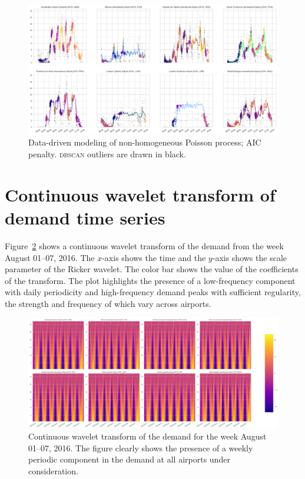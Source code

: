 \documentclass[]{elsarticle}
\newcommand{\DBSCAN}{\textsc{dbscan}}
\begin{document}
  \begin{figure}
      \includegraphics[width=\textwidth]{DDPoisson_AIC}
      \caption{Data-driven modeling of non-homogeneous Poisson process; \ac{AIC} penalty. \DBSCAN{} outliers are drawn in black.}\label{fig:DD_AIC}
  \end{figure}

\section{Continuous wavelet transform of demand time series}\label{sec:appc}

Figure~\ref{fig:cwt} shows a continuous wavelet transform of the demand from the week August 01--07, 2016.
The \(x\)-axis shows the time and the \(y\)-axis shows the scale parameter of the Ricker wavelet. The color bar shows the value of the coefficients of the transform. The plot highlights the presence of a low-frequency component with daily periodicity and high-frequency demand peaks with sufficient regularity, the strength and frequency of which vary across airports.

\begin{figure}
  \includegraphics[width=\textwidth]{ContWavltTrasf}
  \caption{Continuous wavelet transform of the demand for the week August 01--07, 2016. The figure clearly shows the presence of a weekly periodic component in the demand at all airports under consideration.}\label{fig:cwt}
\end{figure}
\end{document}
